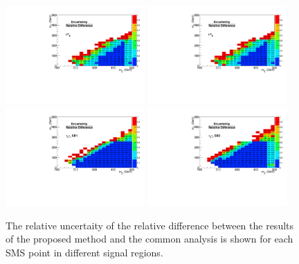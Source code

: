 \begin{figure}[!Hhtb]
\centering
\includegraphics[width=0.475\textwidth,keepaspectratio=true]{ModelTesting/RelativeUncertaintymuTau.pdf}
\includegraphics[width=0.475\textwidth,keepaspectratio=true]{ModelTesting/RelativeUncertaintymuTau.pdf}
\includegraphics[width=0.475\textwidth,keepaspectratio=true]{ModelTesting/RelativeUncertaintyTauTauBin1.pdf}
\includegraphics[width=0.475\textwidth,keepaspectratio=true]{ModelTesting/RelativeUncertaintyTauTauBin2.pdf}
\caption{The relative uncertaity of the relative difference between the results of the proposed method and the common analysis is shown for each SMS point in different signal regions.}
\label{fig:RelativeUncertainty}
\end{figure}

